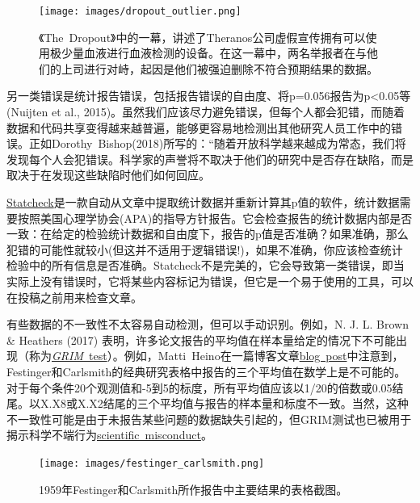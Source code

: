 \documentclass[
  letterpaper,
  DIV=11,
  numbers=noendperiod]{scrreprt}
\begin{document}
\begin{figure}

{\centering \texttt{[image: images/dropout\_outlier.png]}

}

\caption{\label{fig-outliers}《The~Dropout》中的一幕，讲述了Theranos公司虚假宣传拥有可以使用极少量血液进行血液检测的设备。在这一幕中，两名举报者在与他们的上司进行对峙，起因是他们被强迫删除不符合预期结果的数据。}

\end{figure}

另一类错误是统计报告错误，包括报告错误的自由度、将p=0.056报告为p\textless0.05等(Nuijten
et al.,
2015)。虽然我们应该尽力避免错误，但每个人都会犯错，而随着数据和代码共享变得越来越普遍，能够更容易地检测出其他研究人员工作中的错误。正如Dorothy~Bishop(2018)所写的：``随着开放科学越来越成为常态，我们将发现每个人会犯错误。科学家的声誉将不取决于他们的研究中是否存在缺陷，而是取决于在发现这些缺陷时他们如何回应。

\href{http://statcheck.io/}{Statcheck}是一款自动从文章中提取统计数据并重新计算其p值的软件，统计数据需要按照美国心理学协会(APA)的指导方针报告。它会检查报告的统计数据内部是否一致：在给定的检验统计数据和自由度下，报告的p值是否准确？如果准确，那么犯错的可能性就较小(但这并不适用于逻辑错误!)，如果不准确，你应该检查统计检验中的所有信息是否准确。Statcheck不是完美的，它会导致第一类错误，即当实际上没有错误时，它将某些内容标记为错误，但它是一个易于使用的工具，可以在投稿之前用来检查文章。

有些数据的不一致性不太容易自动检测，但可以手动识别。例如，N. J. L. Brown
\& Heathers (2017)
表明，许多论文报告的平均值在样本量给定的情况下不可能出现（称为\href{http://nickbrown.fr/GRIM}{\emph{GRIM}}\href{http://nickbrown.fr/GRIM}{~test}）。例如，Matti~Heino在一篇博客文章\href{https://mattiheino.com/2016/11/13/legacy-of-psychology/}{blog~post}中注意到，Festinger和Carlsmith的经典研究表格中报告的三个平均值在数学上是不可能的。对于每个条件20个观测值和-5到5的标度，所有平均值应该以1/20的倍数或0.05结尾。以X.X8或X.X2结尾的三个平均值与报告的样本量和标度不一致。当然，这种不一致性可能是由于未报告某些问题的数据缺失引起的，但GRIM测试也已被用于揭示科学不端行为\href{https://en.wikipedia.org/wiki/GRIM_test}{scientific~misconduct}。

\begin{figure}

{\centering \texttt{[image: images/festinger\_carlsmith.png]}

}

\caption{\label{fig-festinger}1959年Festinger和Carlsmith所作报告中主要结果的表格截图。}

\end{figure}
\end{document}
